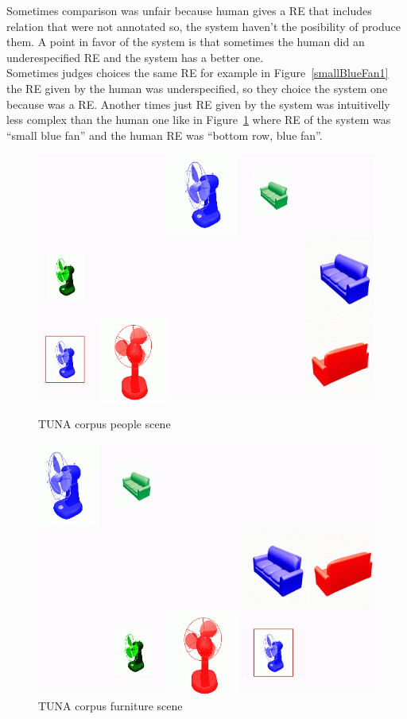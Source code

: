 Sometimes comparison was unfair because human gives a RE that includes relation that were not annotated so, the system haven't the posibility of produce them. A point in favor of the system is that sometimes the human did an underespecified RE and the system has a better one.\\


Sometimes judges choices the same RE for example in Figure~\ref{smallBlueFan1} the RE given by the human was underspecified, so they choice the system one because was a RE. Another times just RE given by the system was intuitivelly less complex than the human one like in Figure~\ref{smallBlueFan} where RE of the system was ``small blue fan'' and the human RE was ``bottom row, blue fan''.
\begin{figure}[ht]
\begin{minipage}{0.50\linewidth}
\centering
\includegraphics[width=\textwidth]{images/smallBlueFan1.jpg}
\caption{TUNA corpus people scene}
\label{smallBlueFan1}
\end{minipage}
\begin{minipage}{0.50\linewidth}
\centering
\includegraphics[width=\textwidth]{images/smallBlueFan.jpg}
\caption{TUNA corpus furniture scene}
\label{smallBlueFan}
\end{minipage}
\end{figure}

